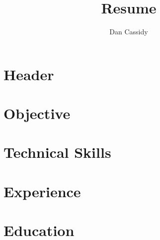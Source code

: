 \documentclass{resume}
\title{Resume}
\author{Dan Cassidy}
\date{ }
\begin{document}
\maketitle

\section{Header}


\section{Objective}


\section{Technical Skills}


\section{Experience}


\section{Education}

\end{document}
